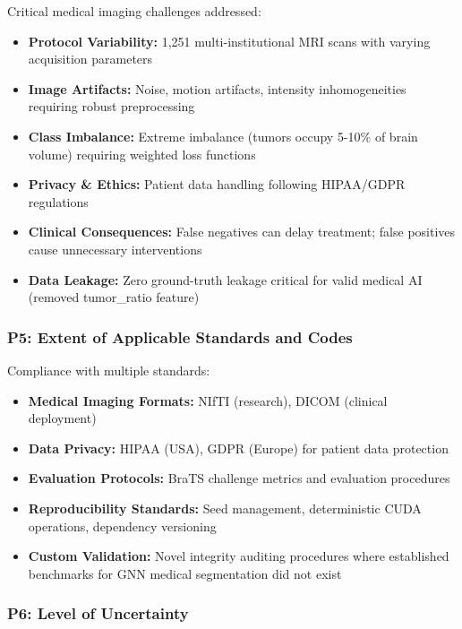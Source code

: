 Critical medical imaging challenges addressed:

\begin{itemize}
    \item \textbf{Protocol Variability:} 1,251 multi-institutional MRI scans with varying acquisition parameters
    \item \textbf{Image Artifacts:} Noise, motion artifacts, intensity inhomogeneities requiring robust preprocessing
    \item \textbf{Class Imbalance:} Extreme imbalance (tumors occupy 5-10\% of brain volume) requiring weighted loss functions
    \item \textbf{Privacy \& Ethics:} Patient data handling following HIPAA/GDPR regulations
    \item \textbf{Clinical Consequences:} False negatives can delay treatment; false positives cause unnecessary interventions
    \item \textbf{Data Leakage:} Zero ground-truth leakage critical for valid medical AI (removed tumor\_ratio feature)
\end{itemize}

\subsubsection*{P5: Extent of Applicable Standards and Codes}

Compliance with multiple standards:

\begin{itemize}
    \item \textbf{Medical Imaging Formats:} NIfTI (research), DICOM (clinical deployment)
    \item \textbf{Data Privacy:} HIPAA (USA), GDPR (Europe) for patient data protection
    \item \textbf{Evaluation Protocols:} BraTS challenge metrics and evaluation procedures
    \item \textbf{Reproducibility Standards:} Seed management, deterministic CUDA operations, dependency versioning
    \item \textbf{Custom Validation:} Novel integrity auditing procedures where established benchmarks for GNN medical segmentation did not exist
\end{itemize}

\subsubsection*{P6: Level of Uncertainty}

